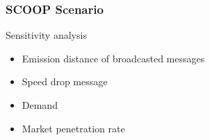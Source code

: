 \begin{frame}
    \frametitle{SCOOP Scenario}

    \begin{center}
    \end{center}
    \begin{alertblock}{Sensitivity analysis}
        \begin{itemize}
            \item Emission distance of broadcasted messages
            \item Speed drop message 
            \item Demand 
            \item Market penetration rate  
        \end{itemize}
    \end{alertblock}    
\end{frame}
